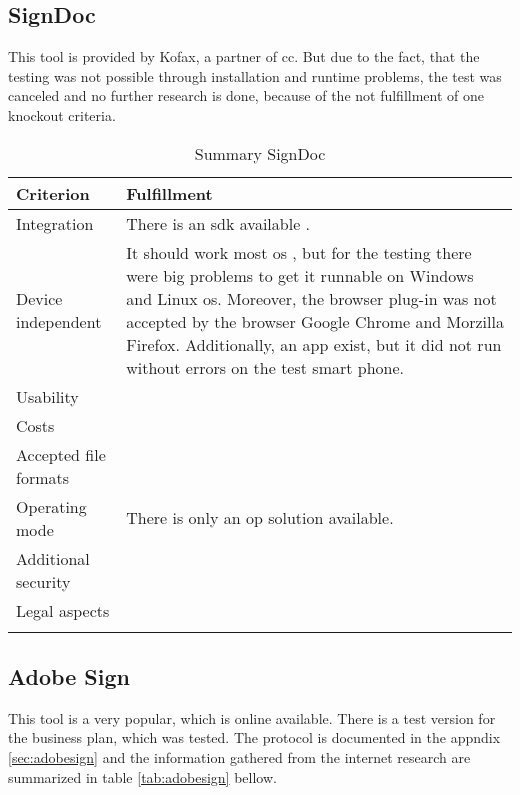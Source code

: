 \subsection{SignDoc}
This tool is provided by Kofax, a partner of \gls{cc}. But due to the fact, that the testing was not possible through installation and runtime problems, the test was canceled and no further research is done, because of the not fulfillment of one knockout criteria. 

	\begin{longtable}{|p{4cm}|p{10cm}|} \hline
		Criterion & Fulfillment \\ \hline
		Integration & There is an \gls{sdk} available \parencite{kofax2018sdk}. \\ \hline
		Device independent & It should work most \gls{os} \parencite{kofax2018sdk}, but for the testing there were big problems to get it runnable on Windows and Linux \gls{os}. Moreover, the browser plug-in was not accepted by the browser Google Chrome and Morzilla Firefox. Additionally, an \gls{app} exist, but it did not run without errors on the test smart phone. \\ \hline
		Usability & \\ \hline
		Costs & \\ \hline
		Accepted file formats & \\ \hline
		Operating mode & There is only an \gls{op} solution available.\\ \hline
		Additional security & \\ \hline
		Legal aspects & \\ \hline
	\caption{Summary SignDoc}
	\label{tab:signdoc}
	\end{longtable}

\subsection{Adobe Sign}
This tool is a very popular, which is online available. There is a test version for the business plan, which was tested. The protocol is documented in the appndix \ref{sec:adobesign} and the information gathered from the internet research are summarized in table \ref{tab:adobesign} bellow. 
	
